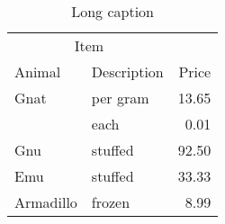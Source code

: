 \begin{table}[]
\centering
\caption[Short caption]{Long caption}
\label{achap3:tab:example}
\begin{tabular}{llr}
\hline
\multicolumn{2}{c}{Item} &           \\ \cline{1-2}
Animal     & Description & Price     \\ \hline
Gnat       & per gram    & 13.65     \\
           & each        & 0.01      \\
Gnu        & stuffed     & 92.50     \\
Emu        & stuffed     & 33.33     \\
Armadillo  & frozen      & 8.99      \\ \hline
\end{tabular}
\end{table}
